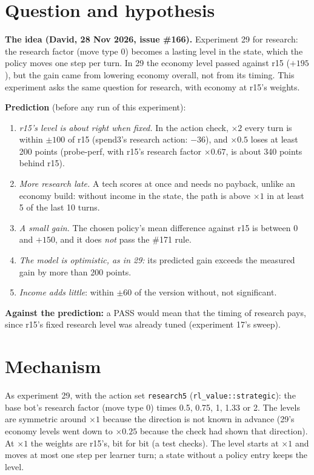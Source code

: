 \documentclass{../polyexp}
\begin{document}

\ExpHeader

\section{Question and hypothesis}
\textbf{The idea (David, 28 Nov 2026, issue \#166).} Experiment 29 for research: the research factor (move type 0) becomes a lasting
level in the state, which the policy moves one step per turn. In 29 the economy level passed against r15 ($+195$),
but the gain came from lowering economy overall, not from its timing. This experiment asks the same question for
research, with economy at r15's weights.

\textbf{Prediction} (before any run of this experiment):
\begin{enumerate}
  \item \emph{r15's level is about right when fixed.} In the action check, $\times2$ every turn is within $\pm100$ of
        r15 (spend3's research action: $-36$), and $\times0.5$ loses at least 200 points (probe-perf, with r15's research
        factor $\times0.67$, is about 340 points behind r15).
  \item \emph{More research late.} A tech scores at once and needs no payback, unlike an economy build: without
        income in the state, the path is above $\times1$ in at least 5 of the last 10 turns.
  \item \emph{A small gain.} The chosen policy's mean difference against r15 is between 0 and $+150$, and it does
        \emph{not} pass the \#171 rule.
  \item \emph{The model is optimistic, as in 29:} its predicted gain exceeds the measured gain by more than 200
        points.
  \item \emph{Income adds little}: within $\pm 60$ of the version without, not significant.
\end{enumerate}
\textbf{Against the prediction:} a PASS would mean that the timing of research pays, since r15's fixed research
level was already tuned (experiment 17's sweep).

\section{Mechanism}
As experiment 29, with the action set \texttt{research5} (\texttt{rl\_value::strategic}): the base bot's research factor (move type 0)
times 0.5, 0.75, 1, 1.33 or 2. The levels are symmetric around $\times1$ because the direction is not known in
advance (29's economy levels went down to $\times0.25$ because the check had shown that direction). At $\times1$ the
weights are r15's, bit for bit (a test checks). The level starts at $\times1$ and moves at most one step per learner
turn; a state without a policy entry keeps the level.
\end{document}
